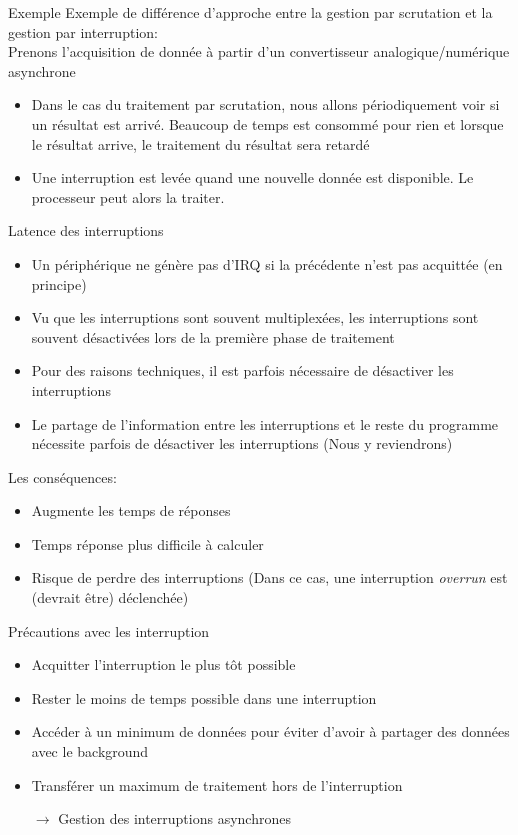 \begin{frame}{Exemple}
  Exemple de différence d'approche  entre la gestion par scrutation et
  la gestion par interruption:
  \\
  Prenons  l'acquisition   de  donnée  à   partir  d'un  convertisseur
  analogique/numérique asynchrone
  \begin{itemize}
  \item  Dans  le  cas  du  traitement  par  scrutation,  nous  allons
    périodiquement voir  si un résultat est arrivé.  Beaucoup de temps
    est  consommé  pour  rien   et  lorsque  le  résultat  arrive,  le
    traitement du résultat sera retardé
  \item  Une interruption  est  levée quand  une  nouvelle donnée  est
    disponible. Le processeur peut alors la traiter.
  \end{itemize}
\end{frame}

\begin{frame}{Latence des interruptions}
  \begin{itemize}
  \item Un périphérique ne génère pas d'IRQ si la précédente n'est pas
    acquittée (en principe)
  \item Vu  que les  interruptions sont souvent  multiplexées, les
    interruptions sont  souvent désactivées lors de  la première phase
    de traitement
  \item  Pour des  raisons techniques,  il est  parfois  nécessaire de
    désactiver les interruptions
  \item  Le partage  de l'information  entre les  interruptions  et le
    reste   du   programme  nécessite   parfois   de  désactiver   les
    interruptions (Nous y reviendrons)
  \end{itemize}
  Les conséquences:
  \begin{itemize}
  \item Augmente les temps de réponses
  \item Temps réponse plus difficile à calculer
  \item  Risque   de  perdre  des  interruptions  (Dans   ce  cas,  une
    interruption \emph{overrun} est (devrait être) déclenchée)
  \end{itemize}
\end{frame}

\begin{frame}{Précautions avec les interruption}
  \begin{itemize}
  \item Acquitter l'interruption le plus tôt possible
  \item Rester le moins de temps possible dans une interruption
  \item Accéder à un minimum de données pour éviter d'avoir à partager
    des données avec le background
  \item Transférer un maximum de traitement hors de l'interruption
  \item[$\rightarrow$] Gestion des interruptions asynchrones
  \end{itemize}
\end{frame}

